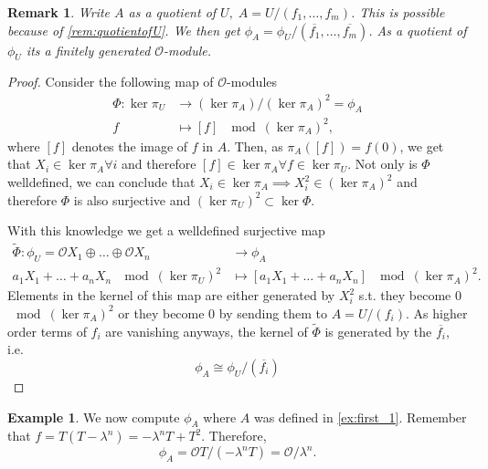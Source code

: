\documentclass{article}
\theoremstyle{plain}%
\newtheorem{remark}{Remark}[section]
\theoremstyle{definition}
\newtheorem{example}{Example}[section]
\theoremstyle{remark}
\begin{document}
\begin{remark}\label{rem:tangentspace}
    Write \(A\) as a quotient of \(U,\; A = U/(f_1, \dots, f_m)\). 
    This is possible because of \cref{rem:quotientofU}.
    We then get \(\phi_A = \phi_U/(\overline{f_1}, \dots, \overline{f_m})\).
    As a quotient of \(\phi_U\) its a finitely generated \(\mathcal{O}\)-module.
\end{remark}
\begin{proof}
    Consider the following map of \(\mathcal{O}\)-modules
    \begin{align*}
        \Phi\colon \ker \pi_U &\to (\ker \pi_A)/(\ker \pi_A)^2 = \phi_A\\
        f &\mapsto [f] \; \mod (\ker \pi_A)^2,
    \end{align*}
    where \([f]\) denotes the image of \(f\) in \(A\).
    Then, as \(\pi_A([f]) = f(0)\), we get that \(X_i \in \ker \pi_A \forall i\)
    and therefore \([f] \in \ker \pi_A \forall f \in \ker \pi_U\). Not only is \(\Phi\) welldefined,
    we can conclude that \(X_i \in \ker \pi_A \implies X_i^2 \in (\ker \pi_A)^2\)
    and therefore \(\Phi\) is also surjective and \((\ker \pi_U)^2 \subset \ker \Phi\).
    
    With this knowledge we get a welldefined surjective map
    \begin{align*}
        \tilde \Phi\colon \phi_U = \mathcal{O}X_1 \oplus \dots \oplus \mathcal{O}X_n &\to \phi_A\\
        a_1X_1 + \dots + a_nX_n \; \mod (\ker \pi_U)^2 &\mapsto [a_1X_1 + \dots + a_nX_n] \; \mod (\ker \pi_A)^2.
    \end{align*}
    Elements in the kernel of this map are either generated by \(X_i^2\) s.t. they become 0 \(\mod (\ker \pi_A)^2\)
    or they become 0 by sending them to \(A = U/(f_i)\).
    As higher order terms of \(f_i\) are vanishing anyways, 
    the kernel of \(\tilde \Phi\) is generated by the \(\overline{f_i}\), i.e.
    \[
        \phi_A \cong \phi_U/(\overline{f_i})  
    \]
\end{proof}

\begin{example}\label{ex:first_phi}
    We now compute \(\phi_A\) where \(A\) was defined in \cref{ex:first_1}.
    Remember that \(f = T(T-\lambda^n) = -\lambda^n T + T^2\). Therefore,
    \[\phi_A = \mathcal{O}T/(-\lambda^n T) = \mathcal{O}/\lambda^n.\]
\end{example}
\end{document}
